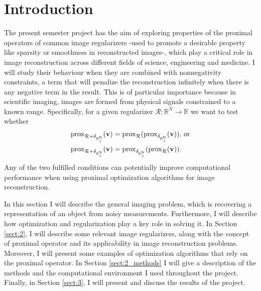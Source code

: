 \section{Introduction} \label{sect:1}

The present semester project has the aim of exploring properties of the proximal operators of common image regularizers -used to promote a desirable property like sparsity or smoothness in reconstructed images-, which play a critical role in image reconstruction across different fields of science, engineering and medicine. I will study their behaviour when they are combined with nonnegativity constraints, a term that will penalize the reconstruction infinitely when there is any negative term in the result. This is of particular importance because in scientific imaging, images are formed from physical signals constrained to a known range. Specifically, for a given regularizer $\mathcal{R}: \mathbb{R}^N\rightarrow \mathbb{R}$ we want to test whether
\begin{equation}
\begin{split}
        \mathrm{prox}_{\mathcal{R} + \delta_{\rm \mathbb{R}_+^N}}(\mathbf{v}) &= \mathrm{prox}_{\mathcal{R}}(\mathrm{prox}_{\delta_{\rm \mathbb{R}_+^N}}(\mathbf{v}))\mbox{, or}\\
        \mathrm{prox}_{\mathcal{R} + \delta_{\rm \mathbb{R}_+^N}}(\mathbf{v}) &= \mathrm{prox}_{\delta_{\rm \mathbb{R}_+^N}}(\mathrm{prox}_{\mathcal{R}}(\mathbf{v})).
    \end{split}    
\end{equation}
Any of the two fulfilled conditions can potentially %
improve computational performance when using proximal optimization algorithms for image reconstruction.

In this section I will describe the general imaging problem, which is recovering a representation of an object from noisy measurements. Furthermore, I will describe how optimization and regularization play a key role in solving it. In Section \ref{sect:2}, I will describe some relevant image regularizers, along with the concept of proximal operator and its applicability in image reconstruction problems. Moreover, I will present some examples of optimization algorithms that rely on the proximal operator. In Section \ref{sect:2_methods} I will give a description of the methods and the computational environment I used throughout the project. Finally, in Section \ref{sect:3}, I will present and discuss the results of the project.  



